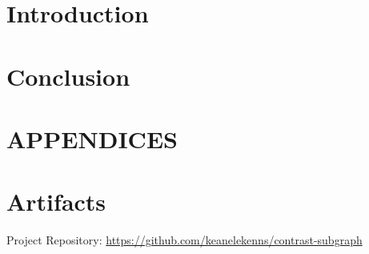 \documentclass[sigconf]{acmart}
\begin{document}
\section{Introduction} \label{intro}

\cite{lanciano2020}

\section{Conclusion} \label{conclusion}





\appendix
\section*{APPENDICES}
\section{Artifacts} \label{artifacts}

Project Repository:
\url{https://github.com/keanelekenns/contrast-subgraph}
\end{document}
